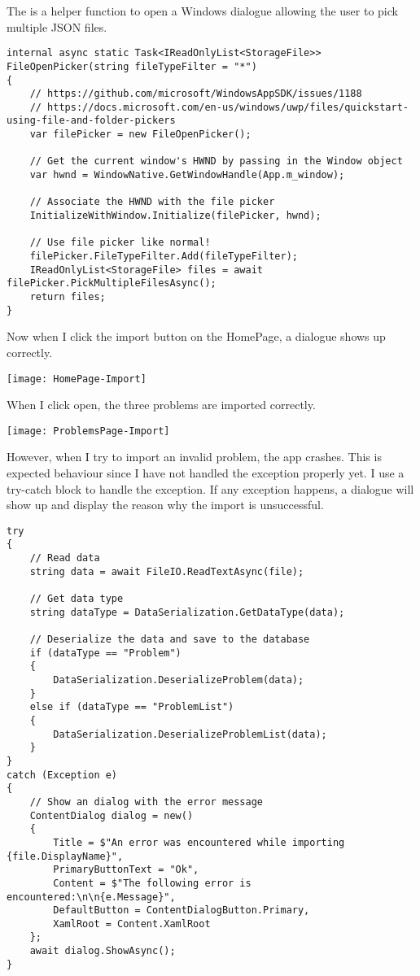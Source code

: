 \documentclass[report.tex]{subfiles}
\begin{document}
The  is a helper function to open a Windows dialogue allowing the user to pick multiple JSON files.

\begin{verbatim}
internal async static Task<IReadOnlyList<StorageFile>> FileOpenPicker(string fileTypeFilter = "*")
{
    // https://github.com/microsoft/WindowsAppSDK/issues/1188
    // https://docs.microsoft.com/en-us/windows/uwp/files/quickstart-using-file-and-folder-pickers
    var filePicker = new FileOpenPicker();

    // Get the current window's HWND by passing in the Window object
    var hwnd = WindowNative.GetWindowHandle(App.m_window);

    // Associate the HWND with the file picker
    InitializeWithWindow.Initialize(filePicker, hwnd);

    // Use file picker like normal!
    filePicker.FileTypeFilter.Add(fileTypeFilter);
    IReadOnlyList<StorageFile> files = await filePicker.PickMultipleFilesAsync();
    return files;
}
\end{verbatim}

Now when I click the import button on the HomePage, a dialogue shows up correctly.

\texttt{[image: HomePage-Import]}

When I click open, the three problems are imported correctly.

\texttt{[image: ProblemsPage-Import]}

However, when I try to import an invalid problem, the app crashes. This is expected behaviour since I have not handled the exception properly yet. I use a try-catch block to handle the exception. If any exception happens, a dialogue will show up and display the reason why the import is unsuccessful.

\begin{verbatim}
try
{
    // Read data
    string data = await FileIO.ReadTextAsync(file);
    
    // Get data type
    string dataType = DataSerialization.GetDataType(data);

    // Deserialize the data and save to the database
    if (dataType == "Problem")
    {
        DataSerialization.DeserializeProblem(data);
    }
    else if (dataType == "ProblemList")
    {
        DataSerialization.DeserializeProblemList(data);
    }
}
catch (Exception e)
{
    // Show an dialog with the error message
    ContentDialog dialog = new()
    {
        Title = $"An error was encountered while importing {file.DisplayName}",
        PrimaryButtonText = "Ok",
        Content = $"The following error is encountered:\n\n{e.Message}",
        DefaultButton = ContentDialogButton.Primary,
        XamlRoot = Content.XamlRoot
    };
    await dialog.ShowAsync();
}
\end{verbatim}
\end{document}
